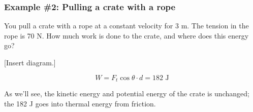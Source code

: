 \subsubsection{Example \#2: Pulling a crate with a rope}
You pull a crate with a rope at a constant velocity for 3 m. The tension in the rope is 70 N. How much work is done to the crate, and where does this energy go?

[Insert diagram.]
\vspace{5cm}

$$W=F_t\cos\theta\cdot{d}=182\mbox{ J}$$

As we'll see, the kinetic energy and potential energy of the crate is unchanged; the 182 J goes into thermal energy from friction.


\clearpage
